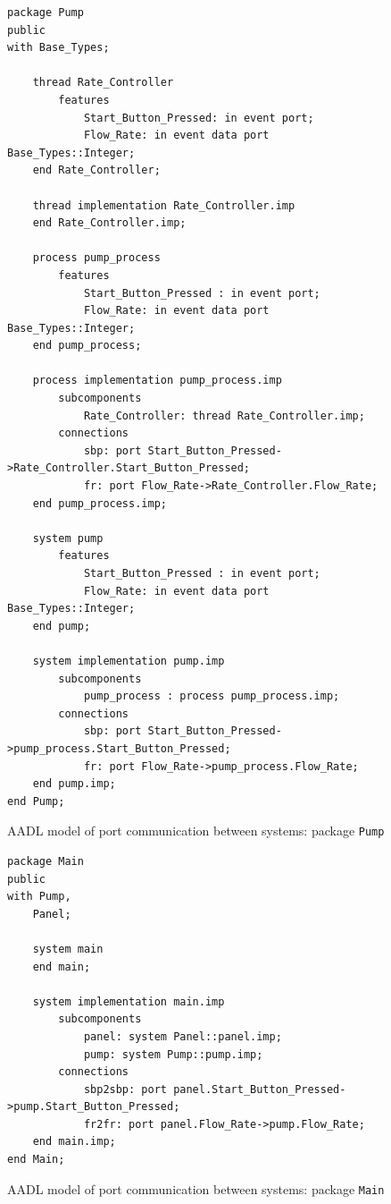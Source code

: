 \begin{figure}
\singlespacing
\begin{lstlisting}[language=aadl, frame=single, gobble=0]
package Pump
public
with Base_Types;

	thread Rate_Controller
		features 
			Start_Button_Pressed: in event port;
			Flow_Rate: in event data port Base_Types::Integer;
	end Rate_Controller;
	
	thread implementation Rate_Controller.imp
	end Rate_Controller.imp;
	
	process pump_process
		features
			Start_Button_Pressed : in event port;
			Flow_Rate: in event data port Base_Types::Integer;
	end pump_process;
	
	process implementation pump_process.imp
		subcomponents
			Rate_Controller: thread Rate_Controller.imp;
		connections		
			sbp: port Start_Button_Pressed->Rate_Controller.Start_Button_Pressed;
			fr: port Flow_Rate->Rate_Controller.Flow_Rate;
	end pump_process.imp;
	
	system pump
		features
			Start_Button_Pressed : in event port;
			Flow_Rate: in event data port Base_Types::Integer;
	end pump;
	
	system implementation pump.imp
		subcomponents
			pump_process : process pump_process.imp;
		connections
			sbp: port Start_Button_Pressed->pump_process.Start_Button_Pressed;
			fr: port Flow_Rate->pump_process.Flow_Rate;
	end pump.imp;
end Pump;
\end{lstlisting} 
\doublespacing
\caption{AADL model of port communication between systems: package \lstinline{Pump}}
\label{listing:port_communication_pump}
\end{figure}

\begin{figure}
\singlespacing
\begin{lstlisting}[language=aadl, frame=single, gobble=0]
package Main
public
with Pump,
	Panel;

	system main	
	end main;
	
	system implementation main.imp
		subcomponents
			panel: system Panel::panel.imp;
			pump: system Pump::pump.imp;
		connections
			sbp2sbp: port panel.Start_Button_Pressed->pump.Start_Button_Pressed;
			fr2fr: port panel.Flow_Rate->pump.Flow_Rate;
	end main.imp;
end Main;
\end{lstlisting} 
\doublespacing
\caption{AADL model of port communication between systems: package \lstinline{Main}}
\label{listing:port_communication_main}
\end{figure}

